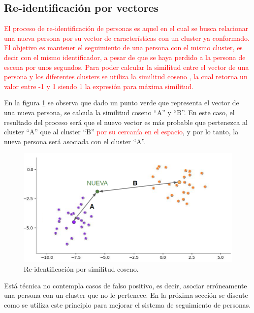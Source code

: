 \subsection{Re-identificación por vectores}

\textcolor{red}{
El proceso de re-identificación de personas es aquel en el cual se busca relacionar una nueva persona por su vector de características con un cluster ya conformado. El objetivo es mantener el seguimiento de una persona con el mismo cluster, es decir con el mismo identificador, a pesar de que se haya perdido a la persona de escena por unos segundos. Para poder calcular la similitud entre el vector de una persona y los diferentes clusters se utiliza la similitud coseno \citep{COSINE_SIMILARITY}, la cual retorna un valor entre -1 y 1 siendo 1 la expresión para máxima similitud.
}

En la figura \ref{fig:similitudCoseno} se observa que dado un punto verde que representa el vector de una nueva persona, se calcula la similitud coseno ``A'' y ``B''. En este caso, el resultado del proceso será que el nuevo vector es más probable que pertenezca al cluster ``A'' que al cluster ``B'' \textcolor{red}{por su cercanía en el espacio}, y por lo tanto, la nueva persona será asociada con el cluster ``A''.

\begin{figure}[ht]
	\centering
	\includegraphics[scale=.6]{./Figures/similitudCoseno.png}
	\caption{Re-identificación por similitud coseno.}
	\label{fig:similitudCoseno}
\end{figure}

Está técnica no contempla casos de falso positivo, es decir, asociar erróneamente una persona con un cluster que no le pertenece. En la próxima sección se discute como se utiliza este principio para mejorar el sistema de seguimiento de personas.


